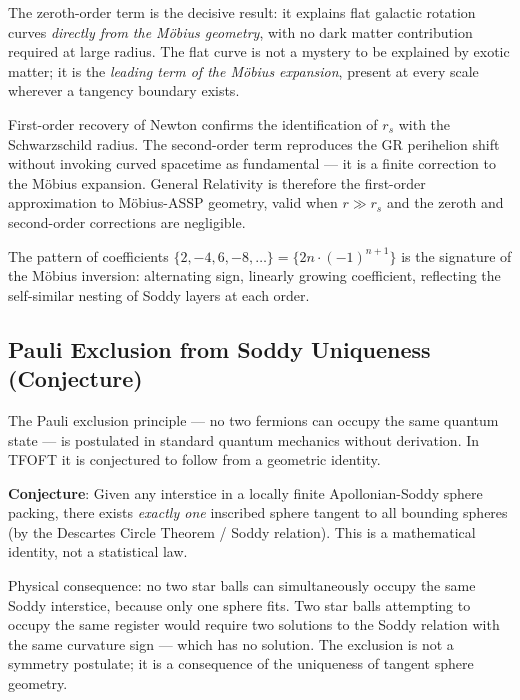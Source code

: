   The zeroth-order term is the decisive result: it explains flat galactic rotation
  curves \emph{directly from the Möbius geometry}, with no dark matter
  contribution required at large radius. The flat curve is not a mystery to be
  explained by exotic matter; it is the \emph{leading term of the Möbius expansion},
  present at every scale wherever a tangency boundary exists.

  First-order recovery of Newton confirms the identification of $r_s$ with the
  Schwarzschild radius. The second-order term reproduces the GR perihelion shift
  without invoking curved spacetime as fundamental --- it is a finite correction
  to the Möbius expansion. General Relativity is therefore the first-order
  approximation to Möbius-ASSP geometry, valid when $r \gg r_s$ and the zeroth
  and second-order corrections are negligible.

  The pattern of coefficients $\{2, -4, 6, -8, \ldots\} = \{2n \cdot (-1)^{n+1}\}$
  is the signature of the Möbius inversion: alternating sign, linearly growing
  coefficient, reflecting the self-similar nesting of Soddy layers at each order.



\subsection{Pauli Exclusion from Soddy Uniqueness (Conjecture)}

  The Pauli exclusion principle --- no two fermions can occupy the same quantum state
  --- is postulated in standard quantum mechanics without derivation. In TFOFT it
  is conjectured to follow from a geometric identity.

  \textbf{Conjecture}: Given any interstice in a locally finite Apollonian-Soddy
  sphere packing, there exists \emph{exactly one} inscribed sphere tangent to all
  bounding spheres (by the Descartes Circle Theorem / Soddy relation). This is a
  mathematical identity, not a statistical law.

  Physical consequence: no two star balls can simultaneously occupy the same Soddy
  interstice, because only one sphere fits. Two star balls attempting to occupy the
  same register would require two solutions to the Soddy relation with the same
  curvature sign --- which has no solution. The exclusion is not a symmetry
  postulate; it is a consequence of the uniqueness of tangent sphere geometry.

